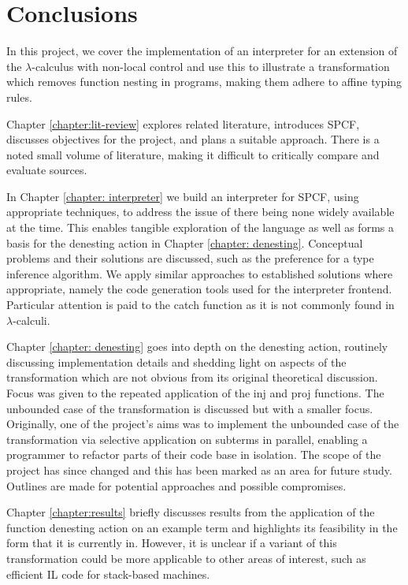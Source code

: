 \documentclass[12pt,a4paper]{report}
\theoremstyle{definition}
\theoremstyle{definition}
\theoremstyle{remark}
\begin{document}
\chapter{Conclusions}

In this project, we cover the implementation of an interpreter for an extension of the $\lambda$-calculus with non-local control and use this to illustrate a transformation which removes function nesting in programs, making them adhere to affine typing rules. 

Chapter \ref{chapter:lit-review} explores related literature, introduces SPCF, discusses objectives for the project, and plans a suitable approach. There is a noted small volume of literature, making it difficult to critically compare and evaluate sources.  

In Chapter \ref{chapter: interpreter} we build an interpreter for SPCF, using appropriate techniques, to address the issue of there being none widely available at the time. This enables tangible exploration of the language as well as forms a basis for the denesting action in Chapter \ref{chapter: denesting}. Conceptual problems and their solutions are discussed, such as the preference for a type inference algorithm. We apply similar approaches to established solutions where appropriate, namely the code generation tools used for the interpreter frontend. Particular attention is paid to the catch function as it is not commonly found in $\lambda$-calculi.

Chapter \ref{chapter: denesting} goes into depth on the denesting action, routinely discussing implementation details and shedding light on aspects of the transformation which are not obvious from its original theoretical discussion. Focus was given to the repeated application of the inj and proj functions. The unbounded case of the transformation is discussed but with a smaller focus. Originally, one of the project's aims was to implement the unbounded case of the transformation via selective application on subterms in parallel, enabling a programmer to refactor parts of their code base in isolation. The scope of the project has since changed and this has been marked as an area for future study. Outlines are made for potential approaches and possible compromises. 

Chapter \ref{chapter:results} briefly discusses results from the application of the function denesting action on an example term and highlights its feasibility in the form that it is currently in. However, it is unclear if a variant of this transformation could be more applicable to other areas of interest, such as efficient IL code for stack-based machines.
\end{document}
